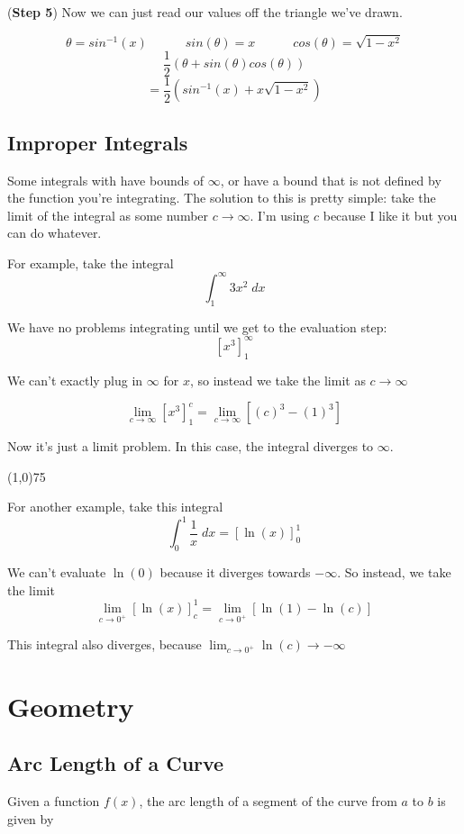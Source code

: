 \documentclass[12pt]{report}
\begin{document}
(\textbf{Step 5}) Now we can just read our values off the triangle we've drawn.

$$ \theta = sin^{-1}(x) \quad \quad \quad sin(\theta) = x \quad \quad \quad cos(\theta) = \sqrt{1-x^2} $$
$$ \frac{1}{2} \left( \theta +  sin(\theta)cos(\theta) \right) $$
$$ = \frac{1}{2} \left( sin^{-1}(x) +  x\sqrt{1-x^2} \right) $$

\clearpage


\section{Improper Integrals}
Some integrals with have bounds of $\infty$, or have a bound that is not defined by the function you're integrating. The solution to this is pretty simple: take the limit of the integral as some number $c\to\infty$. I'm using $c$ because I like it but you can do whatever.

For example, take the integral
$$ \int_1^{\infty} 3x^2 \; dx $$

We have no problems integrating until we get to the evaluation step:
$$ \left[ x^3 \right]_{1}^{\infty} $$

We can't exactly plug in $\infty$ for $x$, so instead we take the limit as $c\to\infty$

$$ \lim_{c\to\infty} \left[ x^3 \right]_{1}^{c} = \lim_{c\to\infty} \left[ (c)^3 - (1)^3 \right] $$

Now it's just a limit problem. In this case, the integral diverges to $\infty$.

\line(1,0){75}

For another example, take this integral
$$ \int_0^1 \frac{1}{x} \; dx = \left[ \ln(x) \right]_0^1 $$

We can't evaluate $\ln(0)$ because it diverges towards $-\infty$. So instead, we take the limit
$$ \lim_{c\to0^+} \left[ \ln(x) \right]_c^1 = \lim_{c\to0^+} \left[ \ln(1) - \ln(c) \right] $$

This integral also diverges, because $\lim_{c\to0^+} \ln(c) \to -\infty$


\clearpage





\chapter{Geometry}

\section{Arc Length of a Curve}
Given a function $f(x)$, the arc length of a segment of the curve from $a$ to $b$ is given by
\end{document}
